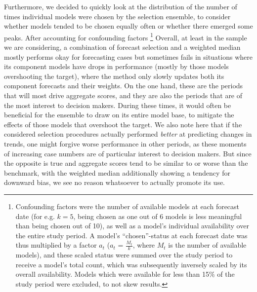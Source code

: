 Furthermore, we decided to quickly look at the distribution of the number of times individual models were chosen by the selection ensemble, to consider whether models tended to be chosen equally often or whether there emerged some peaks.  After accounting for confounding factors \footnote{Confounding factors were the number of available models at each forecast date (for e.g. $k=5$, being chosen as one out of 6 models is less meaningful than being chosen out of 10), as well as a model's individual availability over the entire study period. A model's ``chosen''-status at each forecast date was thus multiplied by a factor $a_t$ ($a_t$ = $\frac{M_t}{k}$, where $M_t$ is the number of available models), and these scaled status were summed over the study period to receive a model's total count, which was subsequently inversely scaled by its overall availability. Models which were available for less than 15\% of the study period were excluded, to not skew results.}
Overall, at least in the sample we are considering, a combination of forecast selection and a weighted median mostly performs okay for forecasting cases but sometimes fails in situations where its component models have drops in performance (mostly by those models overshooting the target), where the method only slowly updates both its component forecasts and their weights. On the one hand, these are the periods that will most drive aggregate scores, and they are also the periods that are of the most interest to decision makers. During these times, it would often be beneficial for the ensemble to draw on its entire model base, to mitigate the effects of those models that overshoot the target. We also note here that if the considered selection procedures actually performed \textit{better} at predicting changes in trends, one might forgive worse performance in other periods, as these moments of increasing case numbers are of particular interest to decision makers. But since the opposite is true and aggregate scores tend to be similar to or worse than the benchmark, with the weighted median additionally showing a tendency for downward bias, we see no reason whatsoever to actually promote its use. \\
